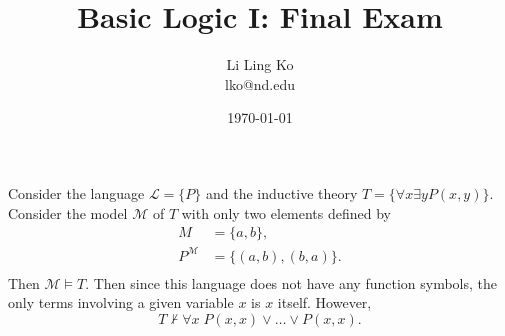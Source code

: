 \documentclass{article}
\begin{document}
\title{Basic Logic I: Final Exam}
\author{Li Ling Ko\\ lko@nd.edu}
\date{\today}
\maketitle

Consider the language $\mathcal{L}=\{P\}$ and the inductive theory
$T=\{\forall x\exists y P(x,y)\}$. Consider the model $\mathcal{M}$ of $T$
with only two elements defined by
\begin{align*}
  M &=\{a,b\}, \\
  P^\mathcal{M} &=\{(a,b),(b,a)\}. \\
\end{align*}
Then $\mathcal{M}\models T$.  Then since this language does not have any
function symbols, the only terms involving a given variable $x$ is $x$
itself. However, \[T\not\vdash \forall x\; P(x,x)\vee\ldots\vee P(x,x).\]

\end{document}

